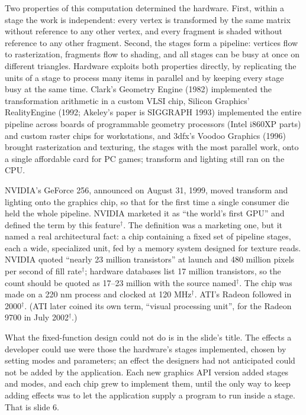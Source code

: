\documentclass[11pt,letterpaper]{article}
\begin{document}
Two properties of this computation determined the hardware. First, within a stage the work is independent: every vertex is transformed by the same matrix without reference to any other vertex, and every fragment is shaded without reference to any other fragment. Second, the stages form a pipeline: vertices flow to rasterization, fragments flow to shading, and all stages can be busy at once on different triangles. Hardware exploits both properties directly, by replicating the units of a stage to process many items in parallel and by keeping every stage busy at the same time. Clark's Geometry Engine (1982) implemented the transformation arithmetic in a custom VLSI chip, Silicon Graphics' RealityEngine (1992; Akeley's paper is SIGGRAPH 1993) implemented the entire pipeline across boards of programmable geometry processors (Intel i860XP parts) and custom raster chips for workstations, and 3dfx's Voodoo Graphics (1996) brought rasterization and texturing, the stages with the most parallel work, onto a single affordable card for PC games; transform and lighting still ran on the CPU.

NVIDIA's GeForce 256, announced on August 31, 1999, moved transform and lighting onto the graphics chip, so that for the first time a single consumer die held the whole pipeline. NVIDIA marketed it as ``the world's first GPU'' and defined the term by this feature$^\dagger$. The definition was a marketing one, but it named a real architectural fact: a chip containing a fixed set of pipeline stages, each a wide, specialized unit, fed by a memory system designed for texture reads. NVIDIA quoted ``nearly 23 million transistors'' at launch and 480 million pixels per second of fill rate$^\dagger$; hardware databases list 17 million transistors, so the count should be quoted as 17--23 million with the source named$^\dagger$. The chip was made on a 220 nm process and clocked at 120 MHz$^\dagger$. ATI's Radeon followed in 2000$^\dagger$. (ATI later coined its own term, ``visual processing unit'', for the Radeon 9700 in July 2002$^\dagger$.)

What the fixed-function design could not do is in the slide's title. The effects a developer could use were those the hardware's stages implemented, chosen by setting modes and parameters; an effect the designers had not anticipated could not be added by the application. Each new graphics API version added stages and modes, and each chip grew to implement them, until the only way to keep adding effects was to let the application supply a program to run inside a stage. That is slide 6.
\end{document}
